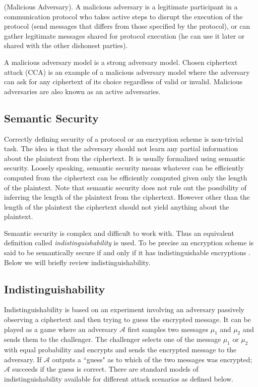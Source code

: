 \begin{definition} \cite{goldreich2009foundations} (Malicious Adversary). A malicious adversary is a legitimate participant in a communication protocol who takes active steps to disrupt the execution of the protocol (send messages that differs from those specified by the protocol), or can gather legitimate messages shared for protocol execution (he can use it later or shared with the other dishonest parties).
\end{definition}

A malicious adversary model is a strong adversary model. Chosen ciphertext attack (CCA) is an example of a malicious adversary model where the adversary can ask for any ciphertext of its choice regardless of valid or invalid. Malicious adversaries are also known as an active adversaries.


\subsection{Semantic Security}
Correctly defining security of a protocol or an encryption scheme is non-trivial task. The idea is that the adversary should not learn any partial information about the plaintext from the ciphertext. It is usually formalized using semantic security. Loosely speaking, semantic security means whatever can be efficiently computed from the ciphertext can be efficiently computed given only the length of the plaintext. Note that semantic security does not rule out the possibility of inferring the length of the plaintext from the ciphertext. However other than the length of the plaintext the ciphertext should not yield anything about the plaintext.

Semantic security is complex and difficult to work with. Thus an equivalent definition called \textit{indistinguishability} is used. To be precise an encryption scheme is said to be semantically secure if and only if it has indistinguishable encryptions \cite{goldreich2009foundations}. Below we will briefly review indistinguishability.


\subsection{Indistinguishability}
Indistinguishability is based on an experiment involving an adversary passively observing a ciphertext and then trying to guess the encrypted message. It can be played as a game where an adversary $\mathcal{A}$ first samples two messages $\mu_1$ and $\mu_2$ and sends them to the challenger. The challenger selects one of the message $\mu_1$ or $\mu_2$ with equal probability and encrypts and sends the encrypted message to the adversary. If $\mathcal{A}$ outputs a ``guess" as to which of the two messages was encrypted; $\mathcal{A}$ succeeds if the guess is correct. There are standard models of indistinguishability available for different attack scenarios as defined below.

